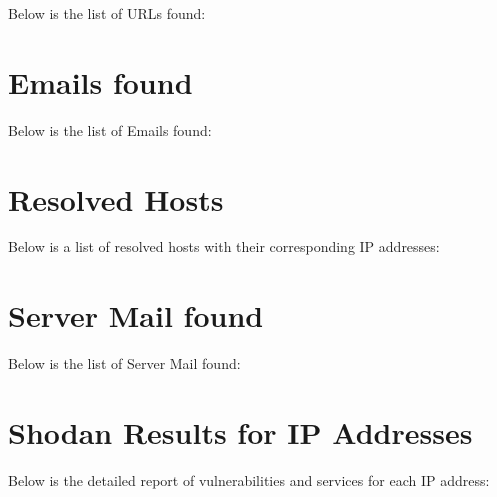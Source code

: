 \documentclass{article}
\begin{document}
Below is the list of URLs found:



\section*{Emails found}

Below is the list of Emails found:


\section*{Resolved Hosts}

Below is a list of resolved hosts with their corresponding IP addresses:


\section*{Server Mail found}

Below is the list of Server Mail found:


\section*{Shodan Results for IP Addresses}

Below is the detailed report of vulnerabilities and services for each IP address:
\end{document}

